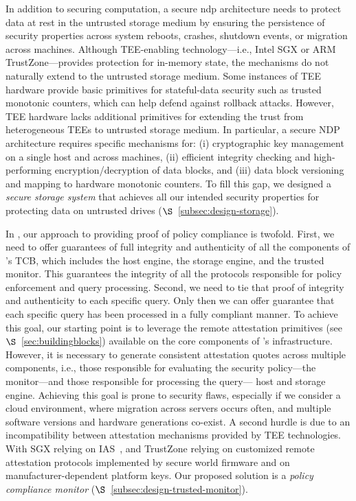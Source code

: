  In addition to securing computation, a secure ndp architecture needs to protect data at rest in the untrusted storage medium by ensuring the persistence of security properties across system reboots, crashes, shutdown events, or migration across machines. 
Although TEE-enabling technology---i.e., Intel SGX or ARM TrustZone---provides protection for in-memory state, the mechanisms do not naturally extend to the untrusted storage medium. 
Some instances of TEE hardware provide basic primitives for stateful-data security such as trusted monotonic counters, which can help defend against rollback attacks. 
However, TEE hardware lacks additional primitives for extending the trust from heterogeneous TEEs to untrusted storage medium. 
In particular, a secure NDP architecture requires specific mechanisms for: (i) cryptographic key management on a single host and across machines, (ii) efficient integrity checking and high-performing encryption/decryption of data blocks, and (iii) data block versioning and mapping to hardware monotonic counters. 
To fill this gap, we designed a \textit{secure storage system} that achieves all our intended security properties for protecting data on untrusted drives ($\S$~\ref{subsec:design-storage}).
\fi

 In \project{}, our approach to providing proof of policy compliance is twofold. First, we need to offer guarantees of full integrity and authenticity of all the components of \project{}'s TCB, which includes the host engine, the storage engine, and the trusted monitor. This guarantees the integrity of all the protocols responsible for policy enforcement and query processing. Second, we need to tie that proof of integrity and authenticity to each specific query. Only then we can offer guarantee that each specific query has been processed in a fully compliant manner. To achieve this goal, our starting point is to leverage the remote attestation primitives (see $\S$~\ref{sec:buildingblocks}) available on the core components of \project{}'s infrastructure. However, %
it is necessary to generate consistent attestation quotes across multiple components, i.e., those responsible for evaluating the security policy---the monitor---and those responsible for processing the query--- host and storage engine. Achieving this goal is prone to security flaws, especially if we consider a cloud environment, where migration across servers occurs often, %
and multiple software versions and hardware generations co-exist. A second hurdle is due to an incompatibility between attestation mechanisms provided by TEE technologies. With SGX relying on IAS~\cite{ias, ananti-hasp-2013}, and TrustZone relying on customized remote attestation protocols implemented by secure world firmware and on manufacturer-dependent platform keys. %
Our proposed solution %
is a \textit{policy compliance monitor} ($\S$~\ref{subsec:design-trusted-monitor}).

